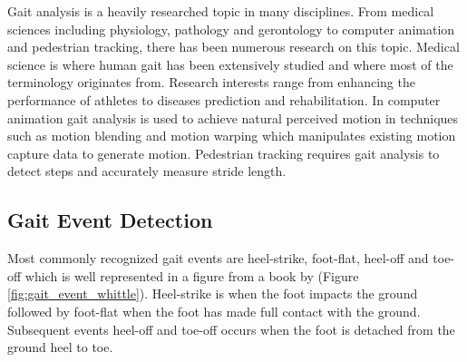 Gait analysis is a heavily researched topic in many disciplines. From medical sciences including physiology, pathology and gerontology to computer animation and pedestrian tracking, there has been numerous research on this topic. Medical science is where human gait has been extensively studied and where most of the terminology originates from. Research interests range from enhancing the performance of athletes to diseases prediction and rehabilitation. In computer animation gait analysis is used to achieve natural perceived motion in techniques such as motion blending and motion warping which manipulates existing motion capture data to generate motion. Pedestrian tracking requires gait analysis to detect steps and accurately measure stride length.

\newpage
\subsection{Gait Event Detection}
Most commonly recognized gait events are heel-strike, foot-flat, heel-off and toe-off which is well represented in a figure from a book by \cite{Whi06} (Figure \ref{fig:gait_event_whittle}). Heel-strike is when the foot impacts the ground followed by foot-flat when the foot has made full contact with the ground. Subsequent events heel-off and toe-off occurs when the foot is detached from the ground heel to toe.

